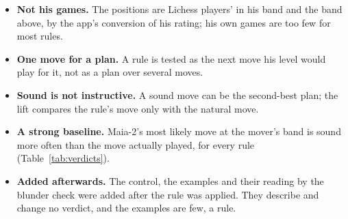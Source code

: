 \documentclass[11pt]{article}
\begin{document}
\begin{itemize}[nosep]
\item \textbf{Not his games.} The positions are Lichess players' in his band and the band above, by
  the app's conversion of his rating; his own games are too few for most rules.
\item \textbf{One move for a plan.} A rule is tested as the next move his level would play for it,
  not as a plan over several moves.
\item \textbf{Sound is not instructive.} A sound move can be the second-best plan; the lift compares
  the rule's move only with the natural move.
\item \textbf{A strong baseline.} Maia-2's most likely move at the mover's band is sound more often
  than the move actually played, for every rule (Table~\ref{tab:verdicts}).
\item \textbf{Added afterwards.} The control, the examples and their reading by the blunder check
  were added after the rule was applied. They describe and change no verdict, and the examples are
  few, \ExPer{} a rule.
\end{itemize}
\end{document}
